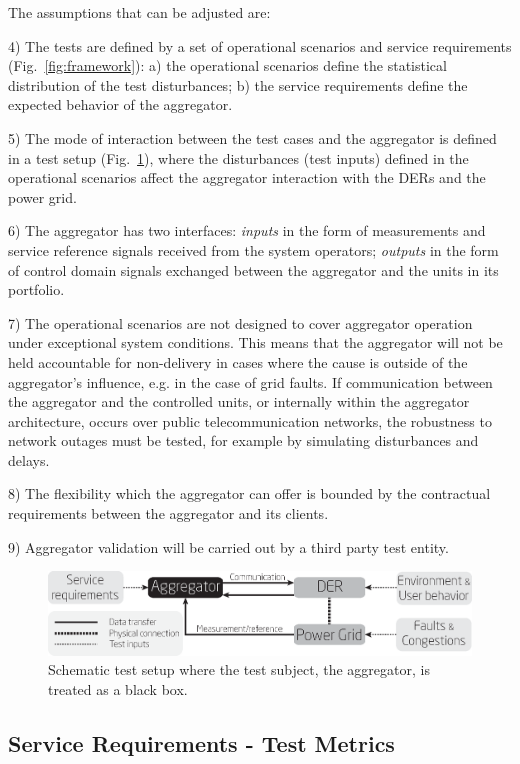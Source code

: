 The assumptions that can be adjusted are:

4) The tests are defined by a set of operational scenarios and service requirements (Fig.~\ref{fig:framework}): a) the operational scenarios define the statistical distribution of the test disturbances; b) the service requirements define the expected behavior of the aggregator. 

5) The mode of interaction between the test cases and the aggregator is defined in a test setup (Fig.~\ref{fig:test_setup}), where the disturbances (test inputs) defined in the operational scenarios affect the aggregator interaction with the DERs and the power grid. 

6) The aggregator has two interfaces: \emph{inputs} in the form of measurements and service reference signals received from the system operators; \emph{outputs} in the form of control domain signals exchanged between the aggregator and the units in its portfolio.

7) The operational scenarios are not designed to cover aggregator operation under exceptional system conditions. This means that the aggregator will not be held accountable for non-delivery in cases where the cause is outside of the aggregator's influence, e.g. in the case of grid faults. If communication between the aggregator and the controlled units, or internally within the aggregator architecture, occurs over public telecommunication networks, the robustness to network outages must be tested, for example by simulating disturbances and delays.

8) The flexibility which the aggregator can offer is bounded by the contractual requirements between the aggregator and its clients.

9) Aggregator validation will be carried out by a third party test entity.

\begin{figure}[!t]
\centering
\includegraphics[width=\columnwidth]{graphics/pscc2016/test_setup.eps}
\caption{Schematic test setup where the test subject, the aggregator, is treated as a black box.}
\label{fig:test_setup}
\end{figure}

\subsection{Service Requirements - Test Metrics}\label{sec:servreqmet}

